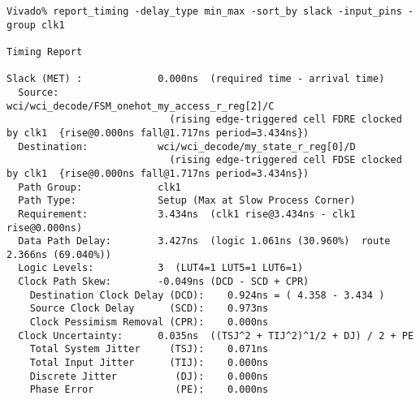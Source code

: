 \documentclass{article}
\begin{document}
\begin{lstlisting}
Vivado% report_timing -delay_type min_max -sort_by slack -input_pins -group clk1

Timing Report

Slack (MET) :             0.000ns  (required time - arrival time)
  Source:                 wci/wci_decode/FSM_onehot_my_access_r_reg[2]/C
                            (rising edge-triggered cell FDRE clocked by clk1  {rise@0.000ns fall@1.717ns period=3.434ns})
  Destination:            wci/wci_decode/my_state_r_reg[0]/D
                            (rising edge-triggered cell FDSE clocked by clk1  {rise@0.000ns fall@1.717ns period=3.434ns})
  Path Group:             clk1
  Path Type:              Setup (Max at Slow Process Corner)
  Requirement:            3.434ns  (clk1 rise@3.434ns - clk1 rise@0.000ns)
  Data Path Delay:        3.427ns  (logic 1.061ns (30.960%)  route 2.366ns (69.040%))
  Logic Levels:           3  (LUT4=1 LUT5=1 LUT6=1)
  Clock Path Skew:        -0.049ns (DCD - SCD + CPR)
    Destination Clock Delay (DCD):    0.924ns = ( 4.358 - 3.434 ) 
    Source Clock Delay      (SCD):    0.973ns
    Clock Pessimism Removal (CPR):    0.000ns
  Clock Uncertainty:      0.035ns  ((TSJ^2 + TIJ^2)^1/2 + DJ) / 2 + PE
    Total System Jitter     (TSJ):    0.071ns
    Total Input Jitter      (TIJ):    0.000ns
    Discrete Jitter          (DJ):    0.000ns
    Phase Error              (PE):    0.000ns


\end{lstlisting}
\end{document}
